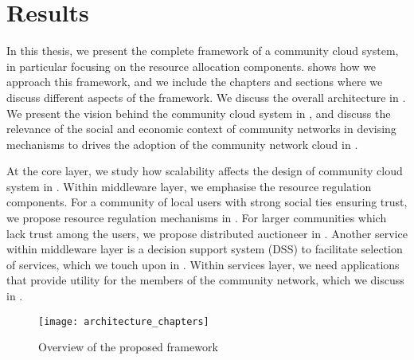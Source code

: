 
\section{Results}
\label{sec___results}

In this thesis, we present the complete framework of a community cloud system, 
in particular focusing on the resource allocation components.
 shows how we approach this framework,
and we include the chapters and sections where we discuss different aspects of the framework.
We discuss the overall architecture
in . 
We present the vision behind the community cloud system in , 
and discuss the relevance of 
the social and economic context of community networks 
in devising mechanisms to drives the adoption of the community network cloud 
in .

At the core layer, we study how scalability affects the design of community cloud system in .
%
Within middleware layer, we emphasise the resource regulation components.
For a community of local users with strong social ties ensuring trust,
we propose resource regulation mechanisms in .
For larger communities which lack trust among the users, 
we propose distributed auctioneer in .
Another service within middleware layer is a decision support system (DSS)
to facilitate selection of services, which we touch upon in .
%
Within services layer, we need applications that provide utility for the members of the community network, which we discuss in .

\begin{figure}[tbp]
	\centering
	\texttt{[image: architecture\_chapters]}
	\caption{Overview of the proposed framework}
	\label{fig__architecture_chapters}
\end{figure}

